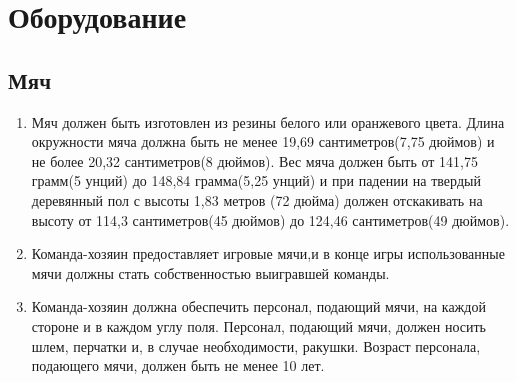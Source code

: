 \documentclass[../main.tex]{subfiles}
\begin{document}
\section{Оборудование}
\subsection{Мяч}

\begin{enumerate}[start=1,label={\arabic{subsection}.\arabic*}]
\item Мяч должен быть изготовлен из резины белого или оранжевого цвета. Длина окружности мяча должна быть не менее  19,69 сантиметров(7,75 дюймов) и не более 20,32 сантиметров(8 дюймов). Вес мяча должен быть от 141,75 грамм(5 унций) до 148,84 грамма(5,25 унций) и при падении на твердый деревянный пол с высоты 1,83 метров (72 дюйма) должен отскакивать на высоту от 114,3 сантиметров(45 дюймов) до 124,46 сантиметров(49 дюймов).
\item Команда-хозяин предоставляет игровые мячи,и в конце игры использованные мячи должны стать собственностью выигравшей команды.

\item Команда-хозяин должна обеспечить персонал, подающий мячи, на каждой стороне и в каждом углу поля. Персонал, подающий мячи, должен носить шлем, перчатки и, в случае необходимости, ракушки. Возраст персонала, подающего мячи, должен быть не менее 10 лет.

\end{enumerate}
\end{document}
